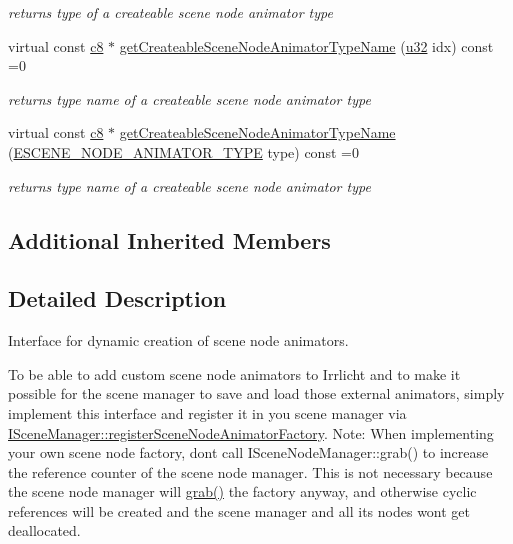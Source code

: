 \begin{DoxyCompactItemize}
\begin{DoxyCompactList}\small\item\em returns type of a createable scene node animator type \end{DoxyCompactList}\item 
virtual const \hyperlink{namespaceirr_a9395eaea339bcb546b319e9c96bf7410}{c8} $\ast$ \hyperlink{classirr_1_1scene_1_1ISceneNodeAnimatorFactory_af33905c1ad6cd478bfbcbda33c82e3bd}{get\+Createable\+Scene\+Node\+Animator\+Type\+Name} (\hyperlink{namespaceirr_a0416a53257075833e7002efd0a18e804}{u32} idx) const =0
\begin{DoxyCompactList}\small\item\em returns type name of a createable scene node animator type \end{DoxyCompactList}\item 
virtual const \hyperlink{namespaceirr_a9395eaea339bcb546b319e9c96bf7410}{c8} $\ast$ \hyperlink{classirr_1_1scene_1_1ISceneNodeAnimatorFactory_a905e896d9fbb0821dd4bf4214b786116}{get\+Createable\+Scene\+Node\+Animator\+Type\+Name} (\hyperlink{namespaceirr_1_1scene_a327a1e43872705cf8f3f3342fb307d19}{E\+S\+C\+E\+N\+E\+\_\+\+N\+O\+D\+E\+\_\+\+A\+N\+I\+M\+A\+T\+O\+R\+\_\+\+T\+Y\+PE} type) const =0
\begin{DoxyCompactList}\small\item\em returns type name of a createable scene node animator type \end{DoxyCompactList}\end{DoxyCompactItemize}
\subsection*{Additional Inherited Members}


\subsection{Detailed Description}
Interface for dynamic creation of scene node animators. 

To be able to add custom scene node animators to Irrlicht and to make it possible for the scene manager to save and load those external animators, simply implement this interface and register it in you scene manager via \hyperlink{classirr_1_1scene_1_1ISceneManager_af48c93cc41f986f08ed964cc575ee7a0}{I\+Scene\+Manager\+::register\+Scene\+Node\+Animator\+Factory}. Note\+: When implementing your own scene node factory, don\textquotesingle{}t call I\+Scene\+Node\+Manager\+::grab() to increase the reference counter of the scene node manager. This is not necessary because the scene node manager will \hyperlink{classirr_1_1IReferenceCounted_a396f9cdbe311ada278626477b3c6f0f5}{grab()} the factory anyway, and otherwise cyclic references will be created and the scene manager and all its nodes won\textquotesingle{}t get deallocated. 

